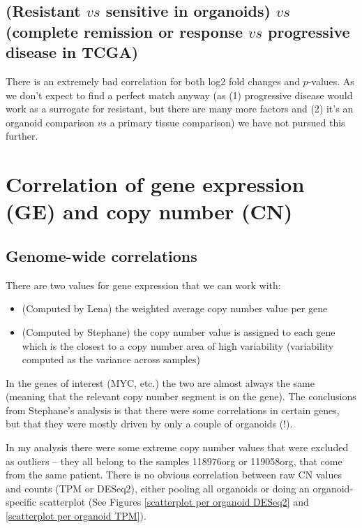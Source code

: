 \documentclass{article}
\begin{document}
\clearpage

\subsection{(Resistant $vs$ sensitive in organoids) $vs$ (complete remission or response $vs$ progressive disease in TCGA) }

There is an extremely bad correlation for both log2 fold changes and $p$-values. As we don't expect to find a perfect match anyway (as (1) progressive disease would work as a surrogate for resistant, but there are many more factors and (2) it's an organoid comparison $vs$ a primary tissue comparison) we have not pursued this further.

\section{Correlation of gene expression (GE) and copy number (CN)}

\subsection{Genome-wide correlations}
There are two values for gene expression that we can work with:
\begin{itemize}
\item (Computed by Lena) the weighted average copy number value per gene
\item (Computed by Stephane) the copy number value is assigned to each gene which is the closest to a copy number area of high variability (variability computed as the variance across samples)
\end{itemize}

In the genes of interest (MYC, etc.) the two are almost always the same (meaning that the relevant copy number segment is on the gene). The conclusions from Stephane's analysis is that there were some correlations in certain genes, but that they were mostly driven by only a couple of organoids (!). 

\medskip

In my analysis there were some extreme copy number values that were excluded as outliers -- they all belong to the samples 118976org or 119058org, that come from the same patient. There is no obvious correlation between raw CN values and counts (TPM or DESeq2), either pooling all organoids or doing an organoid-specific scatterplot (See Figures \href{https://github.com/lm687/Organoids_Compositional_Analysis/blob/master/RNASeq_and_CN/figures/joint_counts_CN_DESeq_all.pdf}{[scatterplot per organoid DESeq2]} and \href{https://github.com/lm687/Organoids_Compositional_Analysis/blob/master/RNASeq_and_CN/figures/joint_counts_CN_TPM_all.pdf}{[scatterplot per organoid TPM]}).
\end{document}
